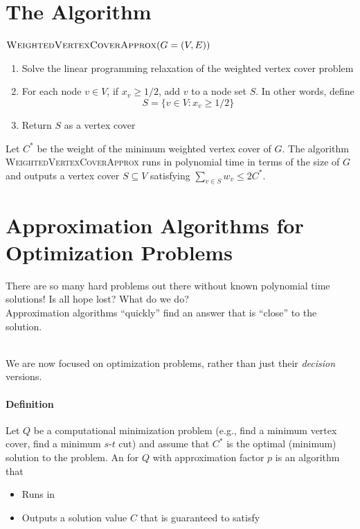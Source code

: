 \documentclass[11  pt]{article}
\begin{document}
\newpage
\section{The Algorithm}
	$\textsc{WeightedVertexCoverApprox}(G = (V,E))$
\begin{enumerate}
	\item Solve the linear programming relaxation of the weighted vertex cover problem
	\item For each node $v \in V$, if $x_v \geq 1/2$, add $v$ to a node set $S$. In other words, define
	\begin{equation*}
		S = \{v \in V \colon x_v \geq 1/2\}
	\end{equation*}
	\item Return $S$ as a vertex cover
\end{enumerate}
\begin{theorem}
	Let $C^*$ be the weight of the minimum weighted vertex cover of $G$. The algorithm \textsc{WeightedVertexCoverApprox} runs in polynomial time in terms of the size of $G$ and outputs a vertex cover $S \subseteq V$ satisfying $\sum_{v \in S} w_v\leq 2C^*$. 
\end{theorem}
	
	
	
	
	
	
	
	
	
	\section{Approximation Algorithms for Optimization Problems}
	There are so many hard problems out there without known polynomial time solutions! Is all hope lost? What do we do?\\
	
	Approximation algorithms ``quickly'' find an answer that is ``close'' to the solution. \\ \\
	
	\vs{3cm} 
	
	We are now focused on optimization problems, rather than just their \emph{decision} versions.
	\paragraph{Definition}
	Let $Q$ be a computational minimization problem (e.g., find a minimum vertex cover, find a minimum $s$-$t$ cut) and assume that $C^*$ is the optimal (minimum) solution to the problem. An  for $Q$ with approximation factor $p$ is an algorithm that 
	\begin{itemize}
		\item Runs in %
		\item Outputs a solution value $C$ that is guaranteed to satisfy %
	\end{itemize}
	
\end{document}
